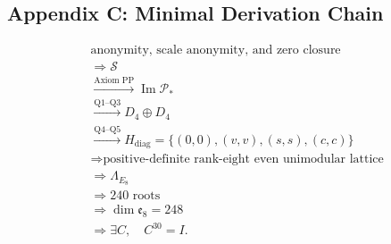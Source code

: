 \documentclass[
  a4paper,
]{article}
\begin{document}
\subsection{Appendix C: Minimal Derivation
Chain}\label{appendix-c-minimal-derivation-chain}

\[
\boxed{
\begin{aligned}
&\text{anonymity, scale anonymity, and zero closure}\\
&\Longrightarrow
\mathscr S\\
&\xrightarrow{\text{Axiom PP}}
\operatorname{Im}\mathcal P_*\\
&\xrightarrow{\text{Q1--Q3}}
D_4\oplus D_4\\
&\xrightarrow{\text{Q4--Q5}}
H_{\mathrm{diag}}
=
\{(0,0),(v,v),(s,s),(c,c)\}\\
&\Longrightarrow
\text{positive-definite rank-eight even unimodular lattice}\\
&\Longrightarrow
\Lambda_{E_8}\\
&\Longrightarrow
240\text{ roots}\\
&\Longrightarrow
\dim\mathfrak e_8
=248\\
&\Longrightarrow
\exists C,\quad C^{30}=I.
\end{aligned}
}
\]
\end{document}
